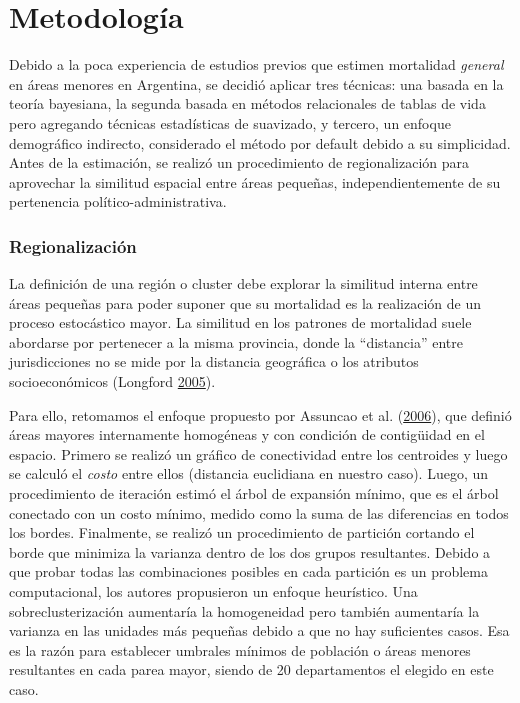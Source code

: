\documentclass[12pt,]{article}
\begin{document}
\hypertarget{metodologuxeda}{%
\section{Metodología}\label{metodologuxeda}}

Debido a la poca experiencia de estudios previos que estimen mortalidad
\emph{general} en áreas menores en Argentina, se decidió aplicar tres
técnicas: una basada en la teoría bayesiana, la segunda basada en
métodos relacionales de tablas de vida pero agregando técnicas
estadísticas de suavizado, y tercero, un enfoque demográfico indirecto,
considerado el método por default debido a su simplicidad. Antes de la
estimación, se realizó un procedimiento de regionalización para
aprovechar la similitud espacial entre áreas pequeñas,
independientemente de su pertenencia político-administrativa.

\hypertarget{regionalizaciuxf3n}{%
\subsubsection{Regionalización}\label{regionalizaciuxf3n}}

La definición de una región o cluster debe explorar la similitud interna
entre áreas pequeñas para poder suponer que su mortalidad es la
realización de un proceso estocástico mayor. La similitud en los
patrones de mortalidad suele abordarse por pertenecer a la misma
provincia, donde la ``distancia'' entre jurisdicciones no se mide por la
distancia geográfica o los atributos socioeconómicos (Longford
\protect\hyperlink{ref-Longford2005}{2005}).

Para ello, retomamos el enfoque propuesto por Assuncao et al.
(\protect\hyperlink{ref-AssunCao2006}{2006}), que definió áreas mayores
internamente homogéneas y con condición de contigüidad en el espacio.
Primero se realizó un gráfico de conectividad entre los centroides y
luego se calculó el \emph{costo} entre ellos (distancia euclidiana en
nuestro caso). Luego, un procedimiento de iteración estimó el árbol de
expansión mínimo, que es el árbol conectado con un costo mínimo, medido
como la suma de las diferencias en todos los bordes. Finalmente, se
realizó un procedimiento de partición cortando el borde que minimiza la
varianza dentro de los dos grupos resultantes. Debido a que probar todas
las combinaciones posibles en cada partición es un problema
computacional, los autores propusieron un enfoque heurístico. Una
sobreclusterización aumentaría la homogeneidad pero también aumentaría
la varianza en las unidades más pequeñas debido a que no hay suficientes
casos. Esa es la razón para establecer umbrales mínimos de población o
áreas menores resultantes en cada parea mayor, siendo de 20
departamentos el elegido en este caso.
\end{document}
